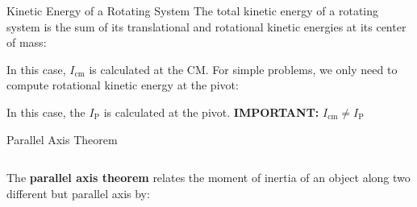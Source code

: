 \documentclass[12pt,compress,aspectratio=169]{beamer}
\begin{document}
\begin{frame}{Kinetic Energy of a Rotating System}
  The total kinetic energy of a rotating system is the sum of its translational
  and rotational kinetic energies at its center of mass:

  
  In this case, $I_\text{cm}$ is calculated at the CM. For simple problems, we
  only need to compute rotational kinetic energy at the pivot:

  
  In this case, the $I_\text{P}$ is calculated at the pivot.
  \textbf{IMPORTANT:} $I_\text{cm}\neq I_\text{P}$
\end{frame}



\begin{frame}{Parallel Axis Theorem}
  \begin{columns}
    
    The \textbf{parallel axis theorem} relates the moment of inertia of an
    object along two different but parallel axis by:

  \end{columns}
\end{frame}
\end{document}
